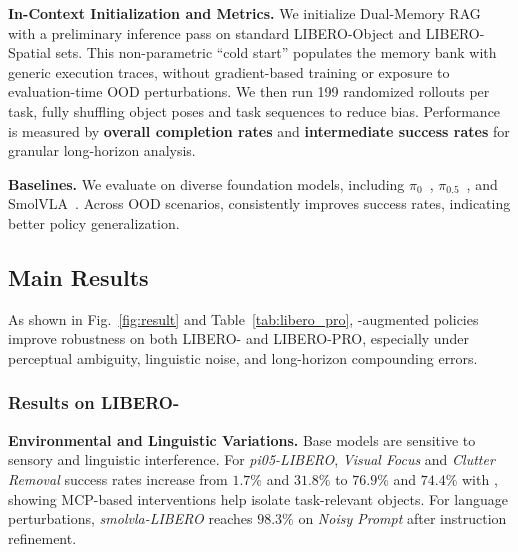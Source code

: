 \noindent\textbf{In-Context Initialization and Metrics.}
We initialize Dual-Memory RAG with a preliminary inference pass on standard LIBERO-Object and LIBERO-Spatial sets.
This non-parametric ``cold start'' populates the memory bank with generic execution traces, without gradient-based training or exposure to evaluation-time OOD perturbations.
We then run 199 randomized rollouts per task, fully shuffling object poses and task sequences to reduce bias.
Performance is measured by \textbf{overall completion rates} and \textbf{intermediate success rates} for granular long-horizon analysis.

\noindent\textbf{Baselines.}
We evaluate {\sys} on diverse foundation models, including $\pi_0$~\cite{pi0}, $\pi_{0.5}$~\cite{pi05}, and SmolVLA~\cite{SmolVLA}.
Across OOD scenarios, {\sys} consistently improves success rates, indicating better policy generalization.

\subsection{Main Results}%
\label{Main Results}

As shown in Fig.~\ref{fig:result} and Table~\ref{tab:libero_pro}, {\sys}-augmented policies improve robustness on both LIBERO-{\sys} and LIBERO-PRO, especially under perceptual ambiguity, linguistic noise, and long-horizon compounding errors.

\subsubsection{Results on LIBERO-{\sys}}

\noindent\textbf{Environmental and Linguistic Variations.}
Base models are sensitive to sensory and linguistic interference.
For \textit{pi05-LIBERO}, \textit{Visual Focus} and \textit{Clutter Removal} success rates increase from $1.7\%$ and $31.8\%$ to $76.9\%$ and $74.4\%$ with {\sys}, showing MCP-based interventions help isolate task-relevant objects.
For language perturbations, \textit{smolvla-LIBERO} reaches $98.3\%$ on \textit{Noisy Prompt} after instruction refinement.

